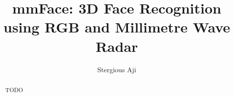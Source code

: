 \documentclass{mpaper}
\begin{document}
\title{mmFace: 3D Face Recognition using RGB and Millimetre Wave Radar}
\author{Stergious Aji}

\maketitle

\begin{abstract}
    TODO


\end{abstract}


\end{document}
